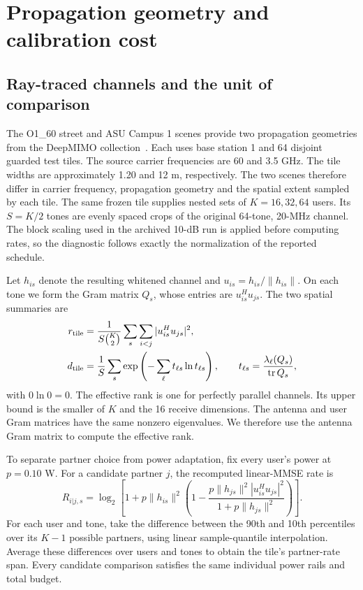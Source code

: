 \section{Propagation geometry and calibration cost}
\label{supp:note5}

\subsection*{Ray-traced channels and the unit of comparison}
The O1\_60 street and ASU Campus 1 scenes provide two propagation geometries from the DeepMIMO collection~\cite{deepmimo}. Each uses base station 1 and 64 disjoint guarded test tiles. The source carrier frequencies are 60 and 3.5 GHz. The tile widths are approximately 1.20 and 12 m, respectively. The two scenes therefore differ in carrier frequency, propagation geometry and the spatial extent sampled by each tile. The same frozen tile supplies nested sets of \(K=16,32,64\) users. Its \(S=K/2\) tones are evenly spaced crops of the original 64-tone, 20-MHz channel. The block scaling used in the archived 10-dB run is applied before computing rates, so the diagnostic follows exactly the normalization of the reported schedule.

Let \(h_{is}\) denote the resulting whitened channel and \(u_{is}=h_{is}/\|h_{is}\|\). On each tone we form the Gram matrix \(Q_s\), whose entries are \(u_{is}^{H}u_{js}\). The two spatial summaries are
\begin{align}
r_{\rm tile}&=\frac{1}{S{K\choose2}}\sum_s\sum_{i<j}|u_{is}^{H}u_{js}|^2,\\
d_{\rm tile}&=\frac1S\sum_s\exp\left(-\sum_\ell t_{\ell s}\ln t_{\ell s}\right),
\qquad t_{\ell s}=\frac{\lambda_\ell(Q_s)}{\operatorname{tr}Q_s},
\end{align}
with \(0\ln0=0\). The effective rank is one for perfectly parallel channels. Its upper bound is the smaller of \(K\) and the 16 receive dimensions. The antenna and user Gram matrices have the same nonzero eigenvalues. We therefore use the antenna Gram matrix to compute the effective rank.

To separate partner choice from power adaptation, fix every user's power at \(p=0.10\) W. For a candidate partner \(j\), the recomputed linear-MMSE rate is
\begin{equation}
R_{i|j,s}=\log_2\left[1+p\|h_{is}\|^2
\left(1-\frac{p\|h_{js}\|^2|u_{is}^{H}u_{js}|^2}
{1+p\|h_{js}\|^2}\right)\right].
\end{equation}
For each user and tone, take the difference between the 90th and 10th percentiles over its \(K-1\) possible partners, using linear sample-quantile interpolation. Average these differences over users and tones to obtain the tile's partner-rate span. Every candidate comparison satisfies the same individual power rails and total budget.

